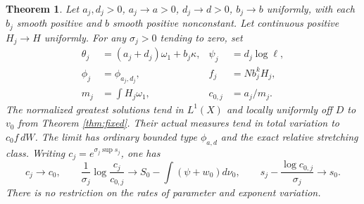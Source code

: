\documentclass[11pt]{article}
\newtheorem{theorem}{Theorem}
\theoremstyle{remark}\newtheorem{remark}[theorem]{Remark}
\begin{document}
\begin{theorem}\label{thm:moving}
Let $a_j,d_j>0$, $a_j\to a>0$, $d_j\to d>0$, $b_j\to b$ uniformly, with each $b_j$
smooth positive and $b$ smooth positive nonconstant. Let continuous positive
$H_j\to H$ uniformly. For any $\sigma_j>0$ tending to zero, set
\[
 \begin{aligned}
 \theta_j&=(a_j+d_j)\omega_1+b_j\kappa,
 &\psi_j&=d_j\log\ell,\\
 \phi_j&=\phi_{a_j,d_j},&f_j&=N b_j^kH_j,\\
 m_j&=\int H_j\omega_1,&c_{0,j}&=a_j/m_j.
 \end{aligned}
\]
The normalized greatest solutions tend in $L^1(X)$ and locally uniformly
off $D$ to $v_0$ from Theorem \ref{thm:fixed}. Their actual measures tend in
total variation to $c_0 f\,dW$. The limit has ordinary bounded type
$\phi_{a,d}$ and the exact relative stretching class.
Writing $c_j=e^{\sigma_j\sup s_j}$, one has
\[
 c_j\to c_0,\qquad
 \frac1{\sigma_j}\log\frac{c_j}{c_{0,j}}
 \longrightarrow S_0-\int(\psi+w_0)d\nu_0,\qquad
 s_j-\frac{\log c_{0,j}}{\sigma_j}\longrightarrow s_0.
\]
There is no restriction on the rates of parameter and exponent variation.
\end{theorem}
\end{document}
